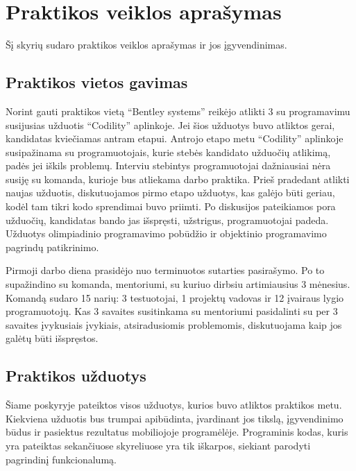 \section{Praktikos veiklos aprašymas}
Šį skyrių sudaro praktikos veiklos aprašymas ir jos įgyvendinimas.

\subsection{Praktikos vietos gavimas}
Norint gauti praktikos vietą \enquote{Bentley systems} reikėjo atlikti 3 su programavimu susijusias užduotis \enquote{Codility} aplinkoje. Jei šios užduotys buvo atliktos gerai, kandidatas kviečiamas antram etapui. Antrojo etapo metu \enquote{Codility} aplinkoje susipažinama su programuotojais, kurie stebės kandidato užduočių atlikimą, padės jei iškils problemų. Interviu stebintys programuotojai dažniausiai nėra susiję su komanda, kurioje bus atliekama darbo praktika. Prieš pradedant atlikti naujas užduotis, diskutuojamos pirmo etapo užduotys, kas galėjo būti geriau, kodėl tam tikri kodo sprendimai buvo priimti. Po diskusijos pateikiamos pora užduočių, kandidatas bando jas išspręsti, užstrigus, programuotojai padeda. Užduotys olimpiadinio programavimo pobūdžio ir objektinio programavimo pagrindų patikrinimo.

Pirmoji darbo diena prasidėjo nuo terminuotos sutarties pasirašymo. Po to supažindino su komanda, mentoriumi, su kuriuo dirbsiu artimiausius 3 mėnesius. Komandą sudaro 15 narių: 3 testuotojai, 1 projektų vadovas ir 12 įvairaus lygio programuotojų. Kas 3 savaites susitinkama su mentoriumi pasidalinti su per 3 savaites įvykusiais įvykiais, atsiradusiomis problemomis, diskutuojama kaip jos galėtų būti išspręstos.




\subsection{Praktikos užduotys}

Šiame poskyryje pateiktos visos užduotys, kurios buvo atliktos praktikos metu. Kiekviena užduotis bus trumpai apibūdinta, įvardinant jos tikslą, įgyvendinimo būdus ir pasiektus rezultatus mobiliojoje programėlėje. Programinis kodas, kuris yra pateiktas sekančiuose skyreliuose yra tik iškarpos, siekiant parodyti pagrindinį funkcionalumą.
